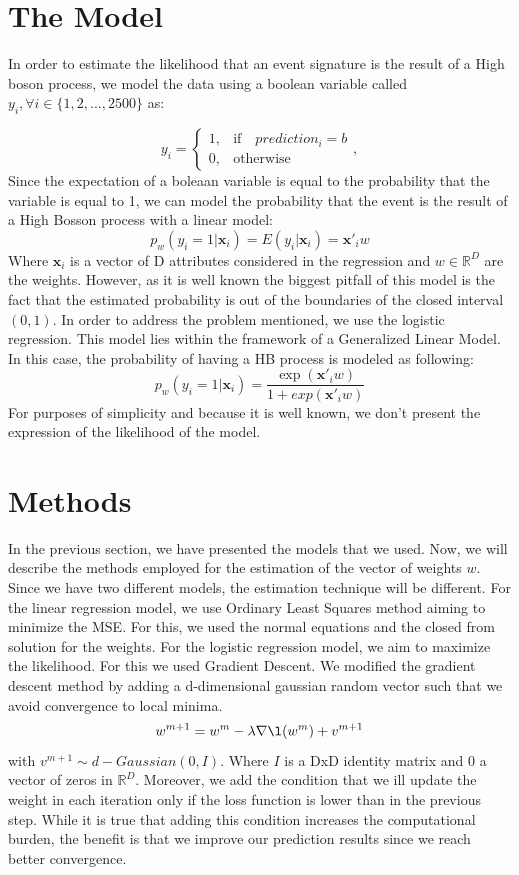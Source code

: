 \documentclass[10pt,conference,compsocconf]{IEEEtran}
\newcommand{\R}{\mathbb{R}}
\begin{document}
\section{The Model}
\label{S1}
In order to estimate the likelihood that an event signature is the result of a High boson process, we model the data using a boolean variable called $y_i, \forall i \in  \{1, 2, ..., 2500\}  $ as:

 $$
y_{i}=
\begin{cases}
1, & \text{if} \quad prediction_i=b\\
0, & \text{otherwise}
\end{cases}
, 
$$
Since the expectation of a boleaan variable is equal to the probability that the variable is equal to 1, we can model the probability that the event is the result of a High Bosson process with a linear model:
$$p_w(y_i=1|\textbf{x}_i)=E(y_i|\textbf{x}_i)=\textbf{x}'_i w$$
Where $\textbf{x}_i $ is a vector of D attributes considered in the regression and $w \in \R^D $ are the weights.
However, as it is well known the biggest pitfall of this model is the fact that the estimated probability is out of the boundaries of the closed interval $ ( 0,1 ) $. 
In order to address the problem mentioned, we use the logistic regression. This model lies within the framework of a Generalized Linear Model.  In this case, the probability of having a HB process is modeled as following:
$$p_w(y_i=1|\textbf{x}_i)=\frac{\exp(\textbf{x}'_i w)}{1+exp(\textbf{x}'_i w)}$$
For purposes of simplicity and because it is well known, we don't present the expression of the likelihood of the model.
\section{Methods}
In the previous section, we have presented the models that we used. Now, we will describe the methods employed for the estimation of the vector of weights $w$. Since we have two different models, the estimation technique will be different. 
For the linear regression model, we use Ordinary Least Squares method aiming to minimize the MSE. For this, we used the normal equations and the closed from solution for the weights. 
For the logistic regression model, we aim to maximize the likelihood. For this we used Gradient Descent. We modified the gradient descent method by adding a d-dimensional gaussian random vector such that we avoid convergence to local minima. 
$$w^{m+1}=w^{m}-\lambda  \nabla \l(w^m) +v^{m+1}$$
with $v^{m+1} \sim d-Gaussian(0,I)$. Where $I$ is a DxD identity matrix and 0 a vector of zeros in $\R^D$.
Moreover, we add the condition that we ill update the weight in each iteration only if the loss function is lower than in the previous step. While it is true that adding this condition increases the computational burden, the benefit is that we improve our prediction results since we reach better convergence.
\end{document}
